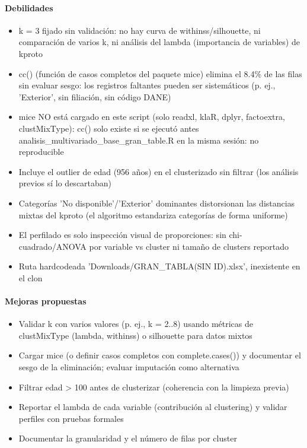 \paragraph{Debilidades}
\begin{itemize}
  \item k = 3 fijado sin validación: no hay curva de withinss/silhouette, ni comparación de varios k, ni análisis del lambda (importancia de variables) de kproto
  \item cc() (función de casos completos del paquete mice) elimina el 8.4\% de las filas sin evaluar sesgo: los registros faltantes pueden ser sistemáticos (p. ej., 'Exterior', sin filiación, sin código DANE)
  \item mice NO está cargado en este script (solo readxl, klaR, dplyr, factoextra, clustMixType): cc() solo existe si se ejecutó antes analisis\_multivariado\_base\_gran\_table.R en la misma sesión: no reproducible
  \item Incluye el outlier de edad (956 años) en el clusterizado sin filtrar (los análisis previos sí lo descartaban)
  \item Categorías 'No disponible'/'Exterior' dominantes distorsionan las distancias mixtas del kproto (el algoritmo estandariza categorías de forma uniforme)
  \item El perfilado es solo inspección visual de proporciones: sin chi-cuadrado/ANOVA por variable vs cluster ni tamaño de clusters reportado
  \item Ruta hardcodeada 'Downloads/GRAN\_TABLA(SIN ID).xlsx', inexistente en el clon
\end{itemize}

\paragraph{Mejoras propuestas}
\begin{itemize}
  \item Validar k con varios valores (p. ej., k = 2..8) usando métricas de clustMixType (lambda, withinss) o silhouette para datos mixtos
  \item Cargar mice (o definir casos completos con complete.cases()) y documentar el sesgo de la eliminación; evaluar imputación como alternativa
  \item Filtrar edad > 100 antes de clusterizar (coherencia con la limpieza previa)
  \item Reportar el lambda de cada variable (contribución al clustering) y validar perfiles con pruebas formales
  \item Documentar la granularidad y el número de filas por cluster
\end{itemize}

